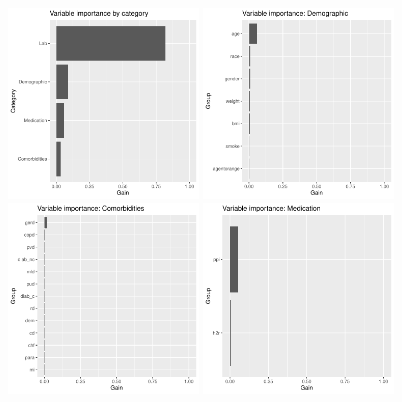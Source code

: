 \documentclass[12pt]{article}
\begin{document}
\clearpage
\begin{figure}[h]
\centering
\includegraphics[width=0.45\textwidth]{figures/vi_cat.pdf}
\includegraphics[width=0.45\textwidth]{figures/vi_group_Demographic_.pdf}
\includegraphics[width=0.45\textwidth]{figures/vi_group_Comorbidities_.pdf}
\includegraphics[width=0.45\textwidth]{figures/vi_group_Medication_.pdf}

\end{figure}
\end{document}
